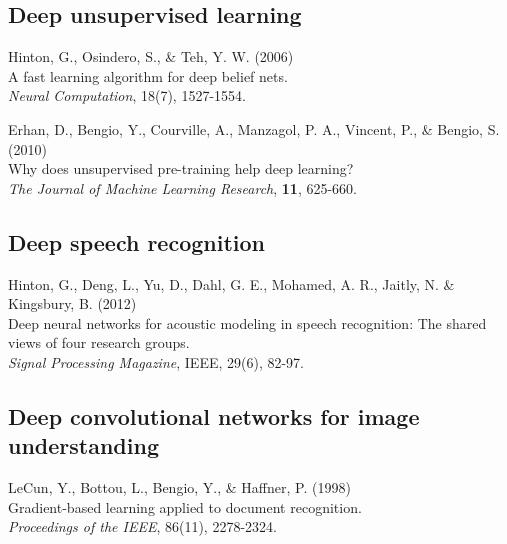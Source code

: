 \documentclass[]{article}
\begin{document}

\subsection{Deep unsupervised learning}
Hinton, G., Osindero, S., \& Teh, Y. W. (2006)\\ A fast learning algorithm for
deep belief nets.\\ {\it Neural Computation}, 18(7), 1527-1554.

Erhan, D., Bengio, Y., Courville, A., Manzagol, P. A., Vincent, P., \& Bengio,
S. (2010)\\ Why does unsupervised pre-training help deep learning?\\ {\it The
  Journal of Machine Learning Research}, {\bf 11}, 625-660.


\subsection{Deep speech recognition}


Hinton, G., Deng, L., Yu, D., Dahl, G. E., Mohamed, A. R., Jaitly, N. \&
Kingsbury, B. (2012)\\ Deep neural networks for acoustic modeling in speech
recognition: The shared views of four research groups.\\ {\it Signal Processing
  Magazine}, IEEE, 29(6), 82-97.


\subsection{Deep convolutional networks for image understanding}
LeCun, Y., Bottou, L., Bengio, Y., \& Haffner, P. (1998)\\ Gradient-based
learning applied to document recognition.\\ {\it Proceedings of the IEEE},
86(11), 2278-2324.
\end{document}
